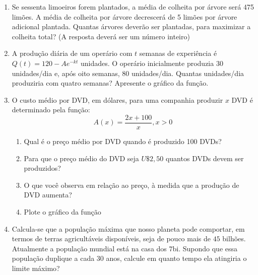 \documentclass[oneside,a4paper,12pt]{article}
\begin{document}
\begin{enumerate}
	\item Se sessenta limoeiros forem plantados, a média de colheita por árvore será 475 limões. A média de colheita por árvore decrescerá de 5 limões por árvore adicional plantada. Quantas árvores deverão ser plantadas, para maximizar a colheita total? (A resposta deverá ser um número inteiro)
	
	
	\item A produção diária de um operário com $t$ semanas de experiência é $Q(t) = 120 - Ae^{-kt}$ unidades. O operário inicialmente produzia 30 unidades/dia e, após oito semanas, 80 unidades/dia. Quantas unidades/dia produziria com quatro semanas? Apresente o gráfico da função.

	\item O custo médio por DVD, em dólares, para uma companhia produzir $x$ DVD é determinado pela função: 
	$$A(x) = \frac{2x+100}{x}, x>0$$
	\begin{enumerate}
		\item Qual é o preço médio por DVD quando é produzido 100 DVDs?
		\item Para que o preço médio do DVD seja $U\$2,50$ quantos DVDs devem ser produzidos?
		\item O que você observa em relação ao preço, à medida que a produção de DVD aumenta?
		\item Plote o gráfico da função
	\end{enumerate}

	\item Calcula-se que a população máxima que nosso planeta pode comportar, em termos de terras agricultáveis disponíveis, seja de pouco mais de $45$ bilhões. Atualmente a população mundial está na casa dos $7$bi. Supondo que essa população duplique a cada $30$ anos, calcule em quanto tempo ela atingiria o limite máximo? 


\end{enumerate}
\end{document}
